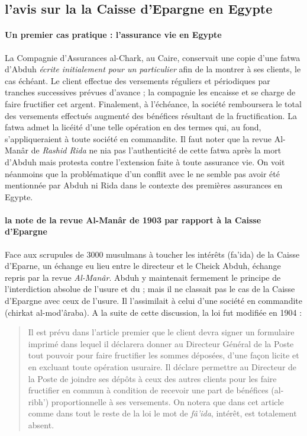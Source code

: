 \subsection{l'avis sur la la Caisse d'Epargne en Egypte}


\paragraph{Un premier cas pratique : l'assurance vie en Egypte}
 La Compagnie d'Assurances al-Chark,
au Caire,  conservait une copie d'une fatwa d'Abduh \textit{écrite initialement pour un particulier} afin de la montrer à ses clients, le cas échéant. Le
client effectue des versements réguliers et périodiques par tranches successives
prévues d'avance ; la compagnie les encaisse et se charge de faire fructifier cet
argent. Finalement, à l'échéance, la société remboursera le total des versements
effectués augmenté des bénéfices résultant de la fructification. La fatwa admet
la licéité d'une telle opération en des termes qui, au fond, s'appliqueraient à toute
société en commandite. Il faut noter que la revue Al-Manâr de \textit{Rashid Rida} ne nia pas l'authenticité de cette fatwa après la mort d'Abduh mais protesta contre l'extension faite à toute assurance vie. On voit néanmoins que la problématique d'un conflit avec le \gharar ne semble pas avoir été mentionnée par Abduh ni Rida dans le contexte des premières assurances en Egypte.

\paragraph{la note de la revue Al-Manâr de 1903 par rapport à la Caisse d'Epargne} Face aux scrupules de 3000 musulmans à toucher les intérêts (fa'ida) de la Caisse d'Eparne, un échange eu lieu entre le directeur et le Cheick Abduh, échange repris par la revue \textit{Al-Manâr}. Abduh y maintenait fermement le principe de
l'interdiction absolue de l'usure et du \riba ; mais il ne classait pas le cas de la Caisse
d'Epargne avec ceux de l'usure. Il l'assimilait à celui d'une société en commandite
(chirkat al-mod'âraba). A la suite de cette discussion, la loi fut modifiée en 1904 : 
 

\begin{quote}
 Il est prévu dans l'article premier que le client devra signer un
formulaire imprimé dans lequel il déclarera donner au Directeur Général de la
Poste tout pouvoir pour faire fructifier les sommes déposées, d'une façon licite et
en excluant toute opération usuraire. Il déclare permettre au Directeur de la Poste
de joindre ses dépôts à ceux des autres clients pour les faire fructifier en commun
à condition de recevoir une part de bénéfices (al-ribh') proportionnelle à ses
versements. On notera que dans cet article comme dans tout le reste de la loi le
mot de \textit{fâ'ida}, intérêt, est totalement absent. 
\end{quote}


